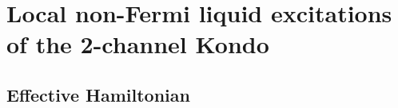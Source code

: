 \documentclass[reprint,prb,superscriptaddress]{revtex4-1}
\begin{document}
%


\section{Local non-Fermi liquid excitations of the 2-channel Kondo}
\subsection{Effective Hamiltonian}
\end{document}

